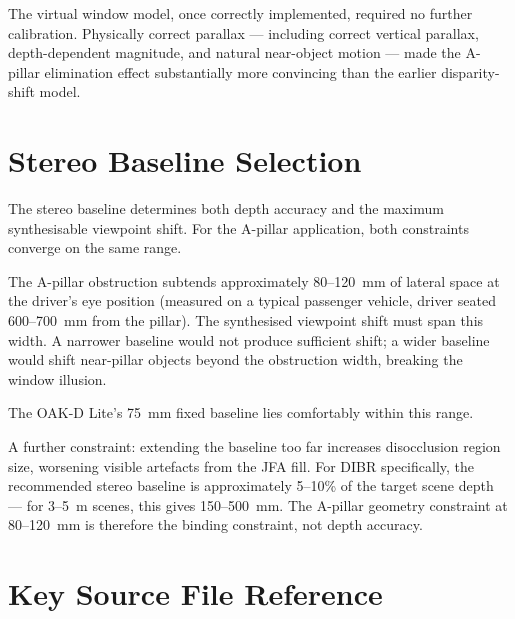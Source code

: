 \documentclass[11pt, a4paper]{report}
\begin{document}
The virtual window model, once correctly implemented, required no further
calibration.
Physically correct parallax --- including correct vertical parallax,
depth-dependent magnitude, and natural near-object motion --- made the
A-pillar elimination effect substantially more convincing than the earlier
disparity-shift model.




\appendix

\chapter{Stereo Baseline Selection}
\label{app:baseline}

The stereo baseline determines both depth accuracy and the maximum
synthesisable viewpoint shift.
For the A-pillar application, both constraints converge on the same range.

The A-pillar obstruction subtends approximately 80--120~mm of lateral
space at the driver's eye position (measured on a typical passenger
vehicle, driver seated 600--700~mm from the pillar).
The synthesised viewpoint shift must span this width.
A narrower baseline would not produce sufficient shift; a wider baseline
would shift near-pillar objects beyond the obstruction width, breaking
the window illusion.

The OAK-D Lite's 75~mm fixed baseline lies comfortably within this
range.

A further constraint: extending the baseline too far increases
disocclusion region size, worsening visible artefacts from the JFA fill.
For DIBR specifically, the recommended stereo baseline is approximately
5--10\% of the target scene depth --- for 3--5~m scenes, this gives
150--500~mm.
The A-pillar geometry constraint at 80--120~mm is therefore the binding
constraint, not depth accuracy.

\chapter{Key Source File Reference}
\label{app:source}
\end{document}
